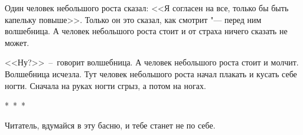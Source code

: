 Один человек небольшого роста сказал: <<Я согласен на все, только бы быть капельку повыше>>. 
Только он это сказал, как  смотрит "--- перед ним волшебница. 
А человек небольшого роста стоит и от страха ничего сказать не может. 

<<Ну?>>~--~говорит волшебница. 
А человек небольшого роста стоит и молчит.
Волшебница исчезла. 
Тут человек небольшого роста начал плакать и кусать себе ногти. 
Сначала на руках ногти сгрыз, а потом на ногах.

\begin{center}
*~*~*
\end{center}

Читатель, вдумайся в эту басню, и тебе станет не по себе.
